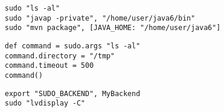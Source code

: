 \begin{lstlisting}[style=Groovybash, label={lst:example_sudo1}, title={
Execution of external command with root privileges.}]
sudo "ls -al"
sudo "javap -private", "/home/user/java6/bin"
sudo "mvn package", [JAVA_HOME: "/home/user/java6"]
\end{lstlisting}

\begin{lstlisting}[style=Groovybash, label={lst:example_sudo2}, title={
Deleyed execution of external command with root privileges.}]
def command = sudo.args "ls -al"
command.directory = "/tmp"
command.timeout = 500
command()
\end{lstlisting}

\begin{lstlisting}[style=Groovybash, label={lst:example_sudo1}, title={
Set back-end for to gain root privileges.}]
export "SUDO_BACKEND", MyBackend
sudo "lvdisplay -C"
\end{lstlisting}

